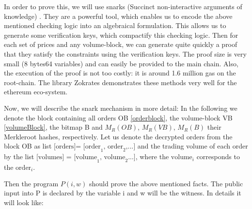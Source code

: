 \documentclass[11pt,parskip=full]{scrartcl}%
\begin{document}
In order to prove this, we will use snarks (Succinct non-interactive arguments of knowledge) \cite{snarks}. 
They are a powerful tool, which enables us to encode the above mentioned checking logic into an algebraical formulation. 
This allows us to generate some verification keys, which compactify this checking logic. 
Then for each set of prices and any volume-block, we can generate quite quickly a proof that they satisfy the constraints using the verification keys. 
The proof size is very small (8 bytes64 variables) and can easily be provided to the main chain. 
Also, the execution of the proof is not too costly: it is around 1.6 million gas on the root-chain. 
The library Zokrates demonstrates these methods very well for the ethereum eco-system. 

Now, we will describe the snark mechanism in more detail: 
In the following we denote the block containing all orders OB \ref{orderblock}, the volume-block VB \ref{volumeBlock}, the bitmap B and $M_R(OB)$, $M_R(VB)$, $M_R(B)$ their Merkleroot hashes, respectively.
Let us denote the decrypted orders from the block OB as list $\text{[orders]= [order}_1\text{, order}_2\text{,...]}$ and the trading volume of each order by the list $\text{[volumes] = [volume}_1\text{, volume}_2\text{...]}$, where the $\text{volume}_i$ corresponds to the $\text{order}_i$. 


Then the program $P(i,w)$ should prove the above mentioned facts. 
The public input into P is declared by the variable i and w will be the witness. 
In details it will look like:
\end{document}
